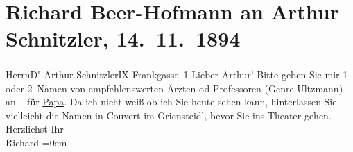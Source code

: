 

         
         \renewcommand{\erwaehntePersonen}{Personen: Alois Hofmann, Robert Ultzmann}
         \renewcommand{\erwaehnteOrte}{Orte: Café Griensteidl, Frankgasse 1, I., Innere Stadt, IX., Alsergrund, Wien}
         \renewcommand{\erwaehnteWerke}{}
               \section[Richard Beer-Hofmann an Arthur Schnitzler, 14. 11. 1894]{ Richard Beer-Hofmann an Arthur Schnitzler, 14. 11. 1894}\nopagebreak{}\rehead{ }\begin{ledgroupsized}[t]{13cm}\normalsize\beginnumbering \toendnotes[C]{\smallbreak\pagebreak[2]} 
\toendnotes[C]{\smallbreak}\pstart{}{\pb}Herrn\pend{}\pstart{}D\textsuperscript{r} Arthur Schnitzler\pend{}\pstart{}IX Frankgasse 1\pend{}{\bigskip}\pstart
           \noindent{}{\pb}Lieber Arthur! Bitte geben Sie mir 1 oder 2 Namen von
               empfehlenswerten Ärzten od Professoren (Genre Ultzmann) an – für \uline{Papa}. Da ich nicht weiß ob ich Sie heute sehen kann, hinterlassen Sie vielleicht die
               Namen in Couvert im Griensteidl, bevor Sie ins
               Theater gehen. Herzlichst\pend
           \pstart
           Ihr{\\[\baselineskip]}\spacefill\mbox{Richard}\pend
           \leftskip=0em{}
         
         \endnumbering{}\end{ledgroupsized}  \newcommand{\dateiname}{L00402}\newcommand{\titel}{Richard Beer-Hofmann an Arthur Schnitzler, 14. 11. 1894}\newcommand{\editorInnen}{Martin Anton Müller und Gerd-Hermann Susen}
      